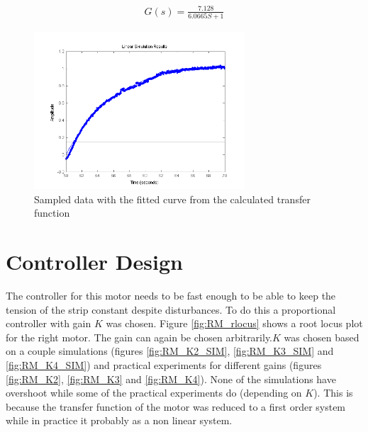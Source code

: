 \begin{align}
	G(s) = \frac{7.128}{6.0665S+1}
    \label{eq:RM_TF}
\end{align}

\begin{figure}[htbp]
\centering
\includegraphics[width = 0.7\textwidth]{pics/RM_systemID.png}
\caption{Sampled data with the fitted curve from the calculated transfer function}
\label{fig:RM_id}
\end{figure}

\FloatBarrier
\section{Controller Design}
The controller for this motor needs to be fast enough to be able to keep the tension of the strip constant despite disturbances. To do this a proportional controller with gain $K$ was chosen. Figure \ref{fig:RM_rlocus} shows a root locus plot for the right motor. The gain can again be chosen arbitrarily.$K$ was chosen based on a couple simulations (figures \ref{fig:RM_K2_SIM}, \ref{fig:RM_K3_SIM} and \ref{fig:RM_K4_SIM}) and  practical experiments for different gains (figures \ref{fig:RM_K2}, \ref{fig:RM_K3} and \ref{fig:RM_K4}). None of the simulations have overshoot while some of the practical experiments do (depending on $K$). This is because the transfer function of the motor was reduced to a first order system while in practice it probably as a non linear system.


